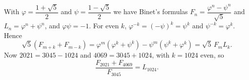 With $\varphi=\dfrac{1+\sqrt5}2$ and $\psi=\dfrac{1-\sqrt5}2$ we have Binet's formulas $F_n=\dfrac{\varphi^n-\psi^n}{\sqrt5}$ and $L_n=\varphi^n+\psi^n$, and $\varphi\psi=-1$. For even $k$, $\varphi^{-k}=(-\psi)^k=\psi^k$ and $\psi^{-k}=\varphi^k$. Hence
\[\sqrt5\left(F_{m+k}+F_{m-k}\right)=\varphi^m\left(\varphi^k+\psi^k\right)-\psi^m\left(\psi^k+\varphi^k\right)=\sqrt5\,F_mL_k.\]
Now $2021=3045-1024$ and $4069=3045+1024$, with $k=1024$ even, so
\[\dfrac{F_{2021}+F_{4069}}{F_{3045}}=\boxed{L_{1024}}.\]
